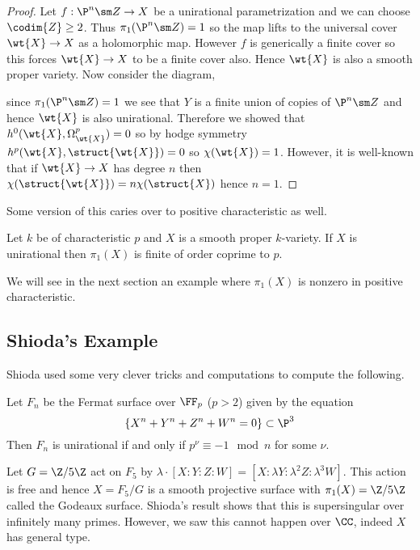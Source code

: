 \documentclass[12pt]{article}
\begin{document}
\begin{proof}
Let $f : \P^n \sm Z \to X$ be a unirational parametrization and we can choose $\codim{Z} \ge 2$. Thus $\pi_1(\P^n \sm Z) = 1$ so the map lifts to the universal cover $\wt{X} \to X$ as a holomorphic map. However $f$ is generically a finite cover so this forces $\wt{X} \to X$ to be a finite cover also. Hence $\wt{X}$ is also a smooth proper variety. Now consider the diagram,
\begin{center}
\end{center}
since $\pi_1(\P^n \sm Z) = 1$ we see that $Y$ is a finite union of copies of $\P^n \sm Z$ and hence $\wt{X}$ is also unirational. Therefore we showed that $h^0(\wt{X}, \Omega_{\wt{X}}^p) = 0$ so by hodge symmetry $h^p(\wt{X}, \struct{\wt{X}}) = 0$ so $\chi(\wt{X}) = 1$. However, it is well-known that if $\wt{X} \to X$ has degree $n$ then $\chi(\struct{\wt{X}}) = n \chi(\struct{X})$ hence $n = 1$. 
\end{proof}

Some version of this caries over to positive characteristic as well. 

\begin{theorem}[Serre]
Let $k$ be of characteristic $p$ and $X$ is a smooth proper $k$-variety. If $X$ is unirational then $\pi_1(X)$ is finite of order coprime to $p$. 
\end{theorem}

We will see in the next section an example where $\pi_1(X)$ is nonzero in positive characteristic.

\subsection{Shioda's Example}

Shioda used some very clever tricks and computations to compute the following.

\begin{theorem}[Shioda]
Let $F_n$ be the Fermat surface over $\FF_p$ ($p > 2$) given by the equation
\[ \{ X^n + Y^n + Z^n + W^n = 0 \} \subset \P^3 \]
Then $F_n$ is unirational if and only if $p^\nu \equiv -1 \mod n$ for some $\nu$.
\end{theorem}

\begin{example}
Let $G = \Z / 5 \Z$ act on $F_5$ by $\lambda \cdot [X : Y : Z : W] = [X : \lambda Y : \lambda^2 Z : \lambda^3 W]$. This action is free and hence $X = F_5 / G$ is a smooth projective surface with $\pi_1(X) = \Z / 5 \Z$ called the Godeaux surface. Shioda's result shows that this is supersingular over infinitely many primes. However, we saw this cannot happen over $\CC$, indeed $X$ has general type. 
\end{example}
\end{document}
